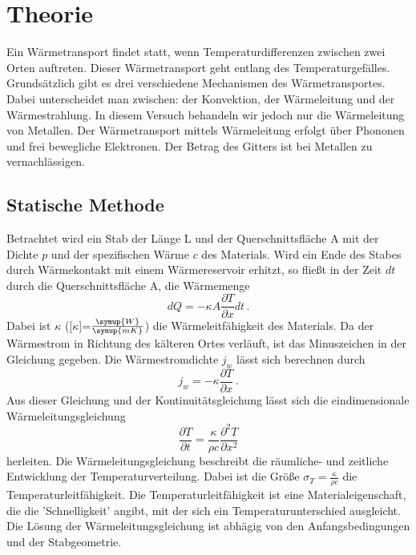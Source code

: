 \section{Theorie}
\label{sec:Theorie}
Ein Wärmetransport findet statt, wenn Temperaturdifferenzen zwischen zwei Orten auftreten.
Dieser Wärmetransport geht entlang des Temperaturgefälles. Grundsätzlich gibt es drei verschiedene Mechanismen des Wärmetransportes.
Dabei unterscheidet man zwischen: der Konvektion, der Wärmeleitung und der Wärmestrahlung.
In diesem Versuch behandeln wir jedoch nur die Wärmeleitung von Metallen.
Der Wärmetransport mittels Wärmeleitung erfolgt über Phononen und frei bewegliche Elektronen. Der Betrag des Gitters ist bei Metallen zu vernachlässigen.
\subsection{Statische Methode}
\label{sec:stM}
Betrachtet wird ein Stab der Länge L und der Querschnittsfläche A mit der Dichte $p$ und der spezifischen Wärme $c$ des Materials.
Wird ein Ende des Stabes durch Wärmekontakt mit einem Wärmereservoir erhitzt, so fließt in der Zeit $dt$ durch die Querschnittsfläche A, die Wärmemenge
\begin{equation}
    dQ=-\kappa A \frac{\partial T}{\partial x} dt\,.
    \label{eqn:Wärmemenge}
\end{equation}
Dabei ist $\kappa$ ([$\kappa$]=$\frac{\symup{W}}{\symup{m K}}$) die Wärmeleitfähigkeit des Materials. Da der Wärmestrom 
in Richtung des kälteren Ortes verläuft, ist das Minuszeichen in der Gleichung gegeben. Die Wärmestromdichte $j_w$ lässt sich berechnen durch
\begin{equation}
    j_w=-\kappa \frac{\partial T}{\partial x}\,.
    \label{eqn:wärmedichte}
\end{equation}
Aus dieser Gleichung und der Kontinuitätsgleichung lässt sich die eindimensionale Wärmeleitungsgleichung
\begin{equation}
    \frac{\partial T}{\partial t}=\frac{\kappa}{\rho c}\frac{\partial^2 T}{\partial x^2}
    \label{eqn:Wärmeleitungsgleichung}
\end{equation}
herleiten. Die Wärmeleitungsgleichung beschreibt die räumliche- und zeitliche Entwicklung der Temperaturverteilung. Dabei ist die Größe $\sigma_T=\frac{\kappa}{\rho c}$
die Temperaturleitfähigkeit. Die Temperaturleitfähigkeit ist eine Materialeigenschaft, die die 'Schnelligkeit' angibt, mit der sich ein Temperaturunterschied ausgleicht.
Die Lösung der Wärmeleitungsgleichung ist abhägig von den Anfangsbedingungen und der Stabgeometrie.
